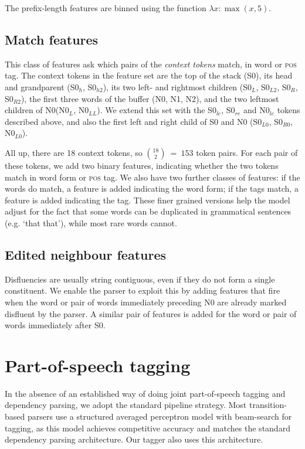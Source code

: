 \documentclass[11pt,letterpaper]{article}
\newcommand{\pos}{\textsc{pos}\xspace}
\newcommand{\szero}{S0\xspace}
\newcommand{\nzero}{N0\xspace}
\newcommand{\szeroH}{S0$_h$\xspace}
\newcommand{\szeroHH}{S0$_{h2}$\xspace}
\newcommand{\szeroL}{S0$_L$\xspace}
\newcommand{\szeroLL}{S0$_{L2}$\xspace}
\newcommand{\szeroR}{S0$_R$\xspace}
\newcommand{\szeroRR}{S0$_{R2}$\xspace}
\newcommand{\szeroLzero}{S0$_{L0}$\xspace}
\newcommand{\szeroRzero}{S0$_{R0}$\xspace}
\newcommand{\nzeroL}{N0$_L$\xspace}
\newcommand{\nzeroLL}{N0$_{LL}$\xspace}
\newcommand{\nzeroLzero}{N0$_{L0}$\xspace}
\newcommand{\szeroRedge}{S0$_{re}$\xspace}
\newcommand{\szeroLedge}{S0$_{le}$\xspace}
\newcommand{\nzeroLedge}{N0$_{le}$\xspace}
\begin{document}
The prefix-length features are binned using the function $\lambda x: \max(x, 5)$.

\subsection{Match features}

This class of features ask which pairs of the \emph{context tokens} match, in
word or \pos tag.  The context tokens in the \citet{zhang:11} feature set
are the top of the stack (\szero), its head and grandparent (\szeroH, \szeroHH),
its two left- and rightmost children (\szeroL, \szeroLL, \szeroR, \szeroRR), the
first three words of the buffer (\nzero, N1, N2), and the two leftmost children
of \nzero (\nzeroL, \nzeroLL).
We extend this set with the \szeroLedge, \szeroRedge and \nzeroLedge tokens
described above, and also the first left and right child of \szero and \nzero
(\szeroLzero, \szeroRzero, \nzeroLzero).

All up, there are 18 context tokens, so ${18 \choose 2}~=~153$ token pairs.
For each pair of these tokens, we add two binary features, indicating whether the
two tokens match in word form or \pos tag.  We also have two further classes of
features: if the words do match, a feature is added indicating the word form;
if the tags match, a feature is added indicating the tag. These finer grained
versions help the model adjust for the fact that some words can be duplicated
in grammatical sentences (e.g. `that that'), while most rare words cannot.

\subsection{Edited neighbour features}

Disfluencies are usually
string contiguous, even if they do not form a single constituent.  
We enable the parser to exploit this by adding features that fire when the word
or pair of words immediately preceding N0 are already marked disfluent by the parser.
A similar pair of features is
added for the word or pair of words immediately after \szero.


\section{Part-of-speech tagging}

In the absence of an established way of doing joint part-of-speech tagging and
dependency parsing, we adopt the standard pipeline strategy.  Most transition-based
parsers use a structured averaged perceptron model with beam-search for tagging,
as this model achieves competitive accuracy and matches the standard dependency
parsing architecture. Our tagger also uses this architecture.
\end{document}
